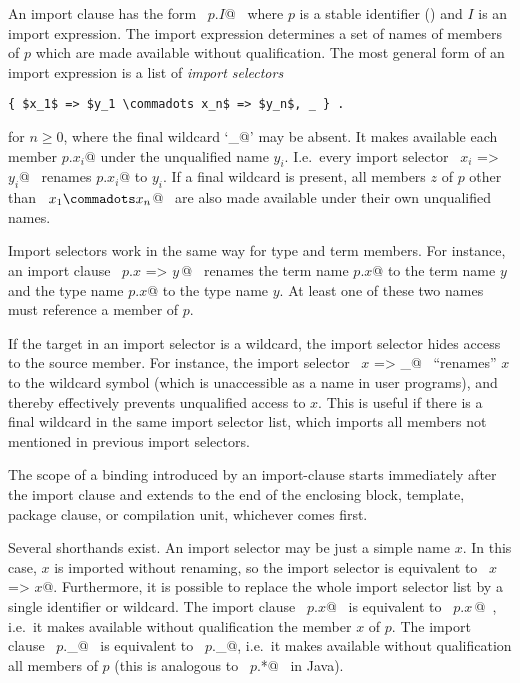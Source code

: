 An import clause has the form ~\lstinline@import $p$.$I$@~ where $p$ is a stable
identifier () and $I$ is an import expression.
The import expression determines a set of names of members of $p$
which are made available without qualification. 
The most general form of an import expression is a list of {\em import
selectors}
\begin{lstlisting}
{ $x_1$ => $y_1 \commadots x_n$ => $y_n$, _ } .
\end{lstlisting}
for $n \geq 0$, where the final wildcard `\lstinline@_@' may be absent.  It
makes available each member \lstinline@$p$.$x_i$@ under the unqualified name
$y_i$. I.e.\ every import selector ~\lstinline@$x_i$ => $y_i$@~ renames
\lstinline@$p$.$x_i$@ to
$y_i$.  If a final wildcard is present, all members $z$ of
$p$ other than ~\lstinline@$x_1 \commadots x_n$@~ are also made available
under their own unqualified names.

Import selectors work in the same way for type and term members. For
instance, an import clause ~\lstinline@import $p$.{$x$ => $y\,$}@~ renames the term
name \lstinline@$p$.$x$@ to the term name $y$ and the type name \lstinline@$p$.$x$@
to the type name $y$. At least one of these two names must
reference a member of $p$.

If the target in an import selector is a wildcard, the import selector
hides access to the source member. For instance, the import selector
~\lstinline@$x$ => _@~ ``renames'' $x$ to the wildcard symbol (which is
unaccessible as a name in user programs), and thereby effectively
prevents unqualified access to $x$. This is useful if there is a
final wildcard in the same import selector list, which imports all
members not mentioned in previous import selectors.

The scope of a binding introduced by an import-clause starts
immediately after the import clause and extends to the end of the
enclosing block, template, package clause, or compilation unit,
whichever comes first.

Several shorthands exist. An import selector may be just a simple name
$x$. In this case, $x$ is imported without renaming, so the
import selector is equivalent to ~\lstinline@$x$ => $x$@. Furthermore, it is
possible to replace the whole import selector list by a single
identifier or wildcard. The import clause ~\lstinline@import $p$.$x$@~ is
equivalent to ~\lstinline@import $p$.{$x\,$}@~, i.e.\ it makes available without
qualification the member $x$ of $p$. The import clause
~\lstinline@import $p$._@~ is equivalent to
~\lstinline@import $p$.{_}@, 
i.e.\ it makes available without qualification all members of $p$
(this is analogous to ~\lstinline@import $p$.*@~ in Java).

